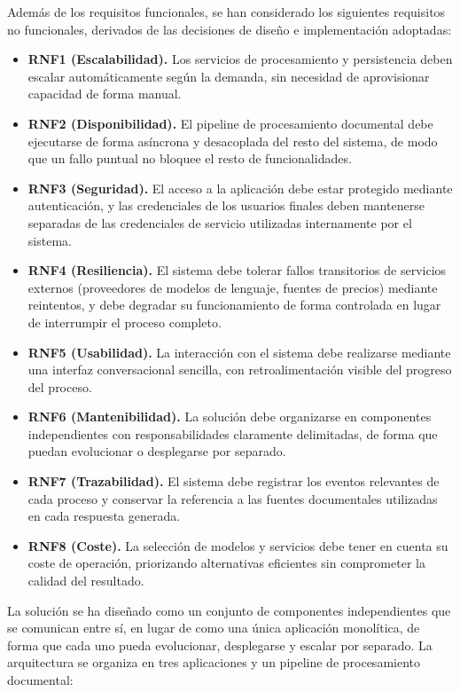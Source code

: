 \TFMTOCPageBreak
{}
Además de los requisitos funcionales, se han considerado los siguientes requisitos no funcionales, derivados de las decisiones de diseño e implementación adoptadas:

\begin{itemize}
\item \textbf{RNF1 (Escalabilidad).} Los servicios de procesamiento y persistencia deben escalar automáticamente según la demanda, sin necesidad de aprovisionar capacidad de forma manual.
\item \textbf{RNF2 (Disponibilidad).} El pipeline de procesamiento documental debe ejecutarse de forma asíncrona y desacoplada del resto del sistema, de modo que un fallo puntual no bloquee el resto de funcionalidades.
\item \textbf{RNF3 (Seguridad).} El acceso a la aplicación debe estar protegido mediante autenticación, y las credenciales de los usuarios finales deben mantenerse separadas de las credenciales de servicio utilizadas internamente por el sistema.
\item \textbf{RNF4 (Resiliencia).} El sistema debe tolerar fallos transitorios de servicios externos (proveedores de modelos de lenguaje, fuentes de precios) mediante reintentos, y debe degradar su funcionamiento de forma controlada en lugar de interrumpir el proceso completo.
\item \textbf{RNF5 (Usabilidad).} La interacción con el sistema debe realizarse mediante una interfaz conversacional sencilla, con retroalimentación visible del progreso del proceso.
\item \textbf{RNF6 (Mantenibilidad).} La solución debe organizarse en componentes independientes con responsabilidades claramente delimitadas, de forma que puedan evolucionar o desplegarse por separado.
\item \textbf{RNF7 (Trazabilidad).} El sistema debe registrar los eventos relevantes de cada proceso y conservar la referencia a las fuentes documentales utilizadas en cada respuesta generada.
\item \textbf{RNF8 (Coste).} La selección de modelos y servicios debe tener en cuenta su coste de operación, priorizando alternativas eficientes sin comprometer la calidad del resultado.
\end{itemize}

\clearpage
{}
La solución se ha diseñado como un conjunto de componentes independientes que se comunican entre sí, en lugar de como una única aplicación monolítica, de forma que cada uno pueda evolucionar, desplegarse y escalar por separado. La arquitectura se organiza en tres aplicaciones y un pipeline de procesamiento documental:

